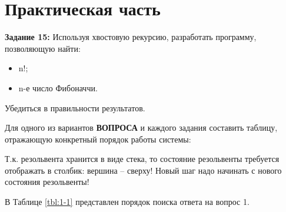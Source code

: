\chapter{Практическая часть}

\textbf{Задание 15:} Используя хвостовую рекурсию, разработать программу, позволяющую найти:
\begin{itemize}
    \item n!;
    \item n-е число Фибоначчи.
\end{itemize}
Убедиться в правильности результатов.

Для одного из вариантов \textbf{ВОПРОСА} и каждого задания составить таблицу, отражающую конкретный порядок работы системы:

Т.к. резольвента хранится в виде стека, то состояние резольвенты требуется отображать в столбик: вершина – сверху! Новый шаг надо начинать с нового состояния резольвенты!



В Таблице \ref{tbl:1-1} представлен порядок поиска ответа на вопрос 1.


